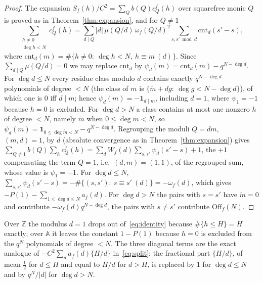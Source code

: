 \documentclass[11pt,a4paper]{article}
\theoremstyle{remark}\newtheorem{remark}[theorem]{Remark}
\newcommand{\Z}{\mathbb{Z}}
\newcommand{\A}{\mathbb{A}}
\begin{document}
\begin{proof}
The expansion $S_f(h)/C^2=\sum_Qb(Q)c^f_Q(h)$ over squarefree monic $Q$ is proved as in
Theorem~\ref{thm:expansion}, and for $Q\ne1$
\[
\sum_{\substack{h\ne0\\\deg h<N}}c^f_Q(h)=\sum_{d\mid Q}|d|\,\mu(Q/d)\,\omega_f(Q/d)^2\sum_{s,s'\bmod d}\mathrm{cnt}_d(s'-s),
\]
where $\mathrm{cnt}_d(m)=\#\{h\ne0:\ \deg h<N,\ h\equiv m\ (d)\}$.
Since $\sum_{d\mid Q}\mu(Q/d)=0$ we may replace $\mathrm{cnt}_d$ by $\psi_d(m)=\mathrm{cnt}_d(m)-q^{N-\deg d}$.
For $\deg d\le N$ every residue class modulo $d$ contains exactly $q^{N-\deg d}$ polynomials of degree $<N$
(the class of $m$ is $\{\tilde m+dg:\ \deg g<N-\deg d\}$), of which one is $0$ iff $d\mid m$; hence
$\psi_d(m)=-\mathbf 1_{d\mid m}$, including $d=1$, where $\psi_1=-1$ because $h=0$ is excluded. For
$\deg d>N$ a class contains at most one nonzero $h$ of degree $<N$, namely $\tilde m$ when
$0\le\deg\tilde m<N$, so $\psi_d(m)=\mathbf 1_{0\le\deg\tilde m<N}-q^{N-\deg d}$. Regrouping the moduli
$Q=dm$, $(m,d)=1$, by $d$ (absolute convergence as in Theorem~\ref{thm:expansion}) gives
$\sum_{Q\ne1}b(Q)\sum_hc^f_Q(h)=\sum_dW_f(d)\sum_{s,s'}\psi_d(s'-s)+1$, the $+1$ compensating the term
$Q=1$, i.e.\ $(d,m)=(1,1)$, of the regrouped sum, whose value is $\psi_1=-1$. For $\deg d\le N$,
$\sum_{s,s'}\psi_d(s'-s)=-\#\{(s,s'):\ s\equiv s'\ (d)\}=-\omega_f(d)$, which gives $-P(1)-\sum_{1\le\deg d\le N}a_f(d)$.
For $\deg d>N$ the pairs with $s=s'$ have $\tilde m=0$ and contribute $-\omega_f(d)q^{N-\deg d}$, the
pairs with $s\ne s'$ contribute $\mathrm{Off}_f(N)$.
\end{proof}

Over $\Z$ the modulus $d=1$ drops out of~\eqref{eq:identity} because $\#\{h\le H\}=H$ exactly; over $\A$
it leaves the constant $1-P(1)$ because $h=0$ is excluded from the $q^N$ polynomials of degree $<N$.
The three diagonal terms are the exact analogue of $-C^2\sum_da_f(d)\{H/d\}$ in~\eqref{eq:split}: the
fractional part $\{H/d\}$, of mean $\tfrac12$ for $d\le H$ and equal to $H/d$ for $d>H$, is replaced by
$1$ for $\deg d\le N$ and by $q^N/|d|$ for $\deg d>N$.
\end{document}
